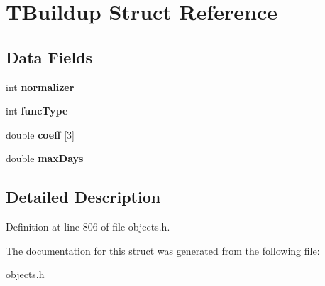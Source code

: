 \hypertarget{struct_t_buildup}{}\section{T\+Buildup Struct Reference}
\label{struct_t_buildup}
\subsection*{Data Fields}
\begin{DoxyCompactItemize}
\item 
\mbox{\label{struct_t_buildup_a7f69d988961bdaecd27469a8619d310c}} 
int {\bfseries normalizer}
\item 
\mbox{\label{struct_t_buildup_a5c897eedceaeaa8c830fe8ad7a12d61f}} 
int {\bfseries func\+Type}
\item 
\mbox{\label{struct_t_buildup_a46c1b51d386af570a4343e7500d2d008}} 
double {\bfseries coeff} \mbox{[}3\mbox{]}
\item 
\mbox{\label{struct_t_buildup_aa0b5861985638f77675491fd075ef083}} 
double {\bfseries max\+Days}
\end{DoxyCompactItemize}


\subsection{Detailed Description}


Definition at line 806 of file objects.\+h.



The documentation for this struct was generated from the following file\+:\begin{DoxyCompactItemize}
\item 
objects.\+h\end{DoxyCompactItemize}
